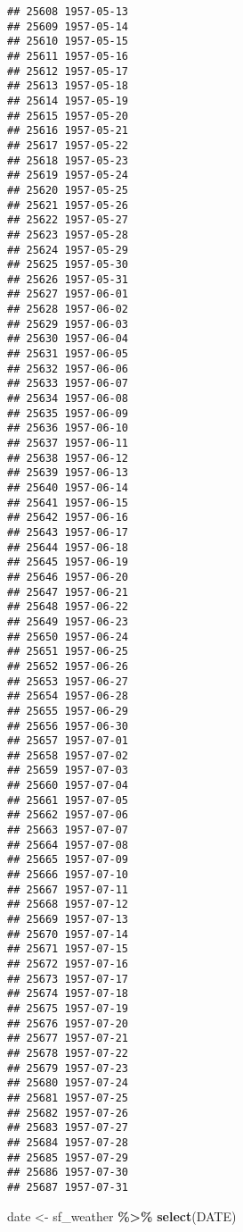 \documentclass[
]{article}
\newenvironment{Shaded}{\begin{snugshade}}{\end{snugshade}}
\newcommand{\FunctionTok}[1]{\textcolor[rgb]{0.13,0.29,0.53}{\textbf{#1}}}
\newcommand{\NormalTok}[1]{#1}
\newcommand{\OtherTok}[1]{\textcolor[rgb]{0.56,0.35,0.01}{#1}}
\newcommand{\SpecialCharTok}[1]{\textcolor[rgb]{0.81,0.36,0.00}{\textbf{#1}}}
\begin{document}
\begin{verbatim}
## 25608 1957-05-13
## 25609 1957-05-14
## 25610 1957-05-15
## 25611 1957-05-16
## 25612 1957-05-17
## 25613 1957-05-18
## 25614 1957-05-19
## 25615 1957-05-20
## 25616 1957-05-21
## 25617 1957-05-22
## 25618 1957-05-23
## 25619 1957-05-24
## 25620 1957-05-25
## 25621 1957-05-26
## 25622 1957-05-27
## 25623 1957-05-28
## 25624 1957-05-29
## 25625 1957-05-30
## 25626 1957-05-31
## 25627 1957-06-01
## 25628 1957-06-02
## 25629 1957-06-03
## 25630 1957-06-04
## 25631 1957-06-05
## 25632 1957-06-06
## 25633 1957-06-07
## 25634 1957-06-08
## 25635 1957-06-09
## 25636 1957-06-10
## 25637 1957-06-11
## 25638 1957-06-12
## 25639 1957-06-13
## 25640 1957-06-14
## 25641 1957-06-15
## 25642 1957-06-16
## 25643 1957-06-17
## 25644 1957-06-18
## 25645 1957-06-19
## 25646 1957-06-20
## 25647 1957-06-21
## 25648 1957-06-22
## 25649 1957-06-23
## 25650 1957-06-24
## 25651 1957-06-25
## 25652 1957-06-26
## 25653 1957-06-27
## 25654 1957-06-28
## 25655 1957-06-29
## 25656 1957-06-30
## 25657 1957-07-01
## 25658 1957-07-02
## 25659 1957-07-03
## 25660 1957-07-04
## 25661 1957-07-05
## 25662 1957-07-06
## 25663 1957-07-07
## 25664 1957-07-08
## 25665 1957-07-09
## 25666 1957-07-10
## 25667 1957-07-11
## 25668 1957-07-12
## 25669 1957-07-13
## 25670 1957-07-14
## 25671 1957-07-15
## 25672 1957-07-16
## 25673 1957-07-17
## 25674 1957-07-18
## 25675 1957-07-19
## 25676 1957-07-20
## 25677 1957-07-21
## 25678 1957-07-22
## 25679 1957-07-23
## 25680 1957-07-24
## 25681 1957-07-25
## 25682 1957-07-26
## 25683 1957-07-27
## 25684 1957-07-28
## 25685 1957-07-29
## 25686 1957-07-30
## 25687 1957-07-31
\end{verbatim}

\begin{Shaded}
\begin{Highlighting}[]
\NormalTok{date }\OtherTok{\textless{}{-}}\NormalTok{ sf\_weather }\SpecialCharTok{\%\textgreater{}\%}
  \FunctionTok{select}\NormalTok{(DATE)}
\end{Highlighting}
\end{Shaded}
\end{document}

